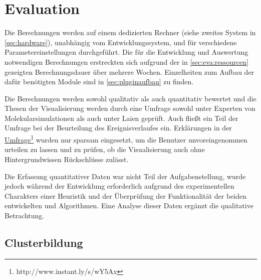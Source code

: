 \chapter{Evaluation}

Die Berechnungen werden auf einem dedizierten Rechner (siehe zweites System in \autoref{sec:hardware}), unabhängig vom Entwicklungssystem, und für verschiedene Parametereinstellungen durchgeführt. Die für die Entwicklung und Auswertung notwendigen Berechnungen erstreckten sich aufgrund der in \autoref{sec:eva:ressourcen} gezeigten Berechnungsdauer über mehrere Wochen. Einzelheiten zum Aufbau der dafür benötigten Module sind in \autoref{sec:pluginaufbau} zu finden.

Die Berechnungen werden sowohl qualitativ als auch quantitativ bewertet und die Thesen der Visualisierung werden durch eine Umfrage sowohl unter Experten von Molekularsimulationen als auch unter Laien geprüft. Auch fließt ein Teil der Umfrage bei der Beurteilung des Ereignisverlaufes ein. Erklärungen in der \href{http://www.instant.ly/s/wY5Ax}{Umfrage}\footnote{http://www.instant.ly/s/wY5Ax} wurden nur sparsam eingesetzt, um die Benutzer unvoreingenommen urteilen zu lassen und zu prüfen, ob die Visualisierung auch ohne Hintergrundwissen Rückschlüsse zulässt.

Die Erfassung quantitativer Daten war nicht Teil der Aufgabenstellung, wurde jedoch während der Entwicklung erforderlich aufgrund des experimentellen Charakters einer Heuristik und der Überprüfung der Funktionalität der beiden entwickelten \CFD und \SECC Algorithmen. Eine Analyse dieser Daten ergänzt die qualitative Betrachtung.

\section{Clusterbildung}\label{sec:eva:cluster}

